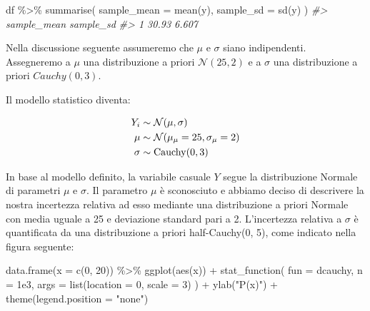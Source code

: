 \documentclass[
  11pt,
]{krantz}
\makeatletter
\newenvironment{Shaded}{\begin{snugshade}}{\end{snugshade}}
\newcommand{\AttributeTok}[1]{\textcolor[rgb]{0.61,0.61,0.61}{#1}}
\newcommand{\CommentTok}[1]{\textcolor[rgb]{0.37,0.37,0.37}{\textit{#1}}}
\newcommand{\DecValTok}[1]{\textcolor[rgb]{0.06,0.06,0.06}{#1}}
\newcommand{\FloatTok}[1]{\textcolor[rgb]{0.06,0.06,0.06}{#1}}
\newcommand{\FunctionTok}[1]{\textcolor[rgb]{0,0,0}{#1}}
\newcommand{\NormalTok}[1]{#1}
\newcommand{\SpecialCharTok}[1]{\textcolor[rgb]{0,0,0}{#1}}
\newcommand{\StringTok}[1]{\textcolor[rgb]{0.5,0.5,0.5}{#1}}
\newenvironment{kframe}{%
\medskip{}
\setlength{\fboxsep}{.8em}
 \def\at@end@of@kframe{}%
 \ifinner\ifhmode%
  \def\at@end@of@kframe{\end{minipage}}%
  \begin{minipage}{\columnwidth}%
 \fi\fi%
 \def\FrameCommand##1{\hskip\@totalleftmargin \hskip-\fboxsep
 \colorbox{shadecolor}{##1}\hskip-\fboxsep
     \hskip-\linewidth \hskip-\@totalleftmargin \hskip\columnwidth}%
 \MakeFramed {\advance\hsize-\width
   \@totalleftmargin\z@ \linewidth\hsize
   \@setminipage}}%
 {\par\unskip\endMakeFramed%
 \at@end@of@kframe}
\renewenvironment{Shaded}{\begin{kframe}}{\end{kframe}}
\DeclareMathOperator{\Cauchy}{Cauchy} %
\theoremstyle{definition}
\theoremstyle{definition}
\theoremstyle{definition}
\theoremstyle{definition}
\theoremstyle{remark}
\makeatother
\begin{document}
\begin{Shaded}
\begin{Highlighting}[]
\NormalTok{df }\SpecialCharTok{\%\textgreater{}\%} 
  \FunctionTok{summarise}\NormalTok{(}
    \AttributeTok{sample\_mean =} \FunctionTok{mean}\NormalTok{(y),}
    \AttributeTok{sample\_sd =} \FunctionTok{sd}\NormalTok{(y)}
\NormalTok{  )}
\CommentTok{\#\textgreater{}   sample\_mean sample\_sd}
\CommentTok{\#\textgreater{} 1       30.93     6.607}
\end{Highlighting}
\end{Shaded}

Nella discussione seguente assumeremo che \(\mu\) e \(\sigma\) siano indipendenti. Assegneremo a \(\mu\) una distribuzione a priori \(\mathcal{N}(25, 2)\) e a \(\sigma\) una distribuzione a priori \(Cauchy(0, 3)\).

Il modello statistico diventa:

\begin{align}
Y_i &\sim \mathcal{N}(\mu, \sigma) \notag\\
\mu &\sim \mathcal{N}(\mu_{\mu} = 25, \sigma_{\mu} = 2) \notag\\
\sigma &\sim \Cauchy(0, 3) \notag
\end{align}

In base al modello definito, la variabile casuale \(Y\) segue la distribuzione Normale di parametri \(\mu\) e \(\sigma\). Il parametro \(\mu\) è sconosciuto e abbiamo deciso di descrivere la nostra incertezza relativa ad esso mediante una distribuzione a priori Normale con media uguale a 25 e deviazione standard pari a 2. L'incertezza relativa a \(\sigma\) è quantificata da una distribuzione a priori half-Cauchy(0, 5), come indicato nella figura seguente:

\begin{Shaded}
\begin{Highlighting}[]
\FunctionTok{data.frame}\NormalTok{(}\AttributeTok{x =} \FunctionTok{c}\NormalTok{(}\DecValTok{0}\NormalTok{, }\DecValTok{20}\NormalTok{)) }\SpecialCharTok{\%\textgreater{}\%}
  \FunctionTok{ggplot}\NormalTok{(}\FunctionTok{aes}\NormalTok{(x)) }\SpecialCharTok{+}
  \FunctionTok{stat\_function}\NormalTok{(}
    \AttributeTok{fun =}\NormalTok{ dcauchy,}
    \AttributeTok{n =} \FloatTok{1e3}\NormalTok{,}
    \AttributeTok{args =} \FunctionTok{list}\NormalTok{(}\AttributeTok{location =} \DecValTok{0}\NormalTok{, }\AttributeTok{scale =} \DecValTok{3}\NormalTok{)}
\NormalTok{  ) }\SpecialCharTok{+}
  \FunctionTok{ylab}\NormalTok{(}\StringTok{"P(x)"}\NormalTok{) }\SpecialCharTok{+}
  \FunctionTok{theme}\NormalTok{(}\AttributeTok{legend.position =} \StringTok{"none"}\NormalTok{)}
\end{Highlighting}
\end{Shaded}
\end{document}
